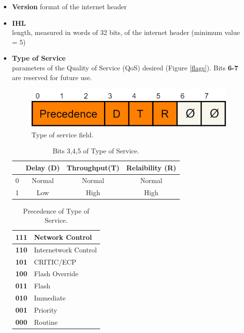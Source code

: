 \begin{itemize}
\item{\textbf{Version}
format of the internet header
}
\item{\textbf{IHL}\\
length, measured in words of 32 bits, of the internet header (minimum value = 5)
}
\item{\textbf{Type of Service}\\
parameters of the Quality of Service (QoS) desired (Figure \ref{flags}). Bits \textbf{6-7} are reserved for future use.
\begin{figure}[h]
\centering
\includegraphics[scale=0.3]{Images/IP/service_type}
\caption{\footnotesize{Type of service field.}}\label{service_type}
\end{figure}
\begin{table}[h]
\centering \footnotesize
\begin{tabular}{|c|c|c|c|}
\cline{2-4}
\multicolumn{1}{c|}{}&{Delay (D)}&{Throughput(T)}&{Relaibility (R)}\\
\hline
{0}&{Normal}&{Normal}&{Normal}\\
\hline
{1}&{Low}&{High}&{High}\\
\hline
\end{tabular}
\caption{Bits 3,4,5 of Type of Service.}
\end{table}
\begin{table}[H]
\centering \footnotesize
\begin{tabular}{|c|l|}
\hline
\textbf{111}&{Network Control}\\
\hline
\textbf{110}&{Internetwork Control}\\
\hline
\textbf{101}&{CRITIC/ECP}\\
\hline
\textbf{100}&{Flash Override}\\
\hline
\textbf{011}&{Flash}\\
\hline
\textbf{010}&{Immediate}\\
\hline
\textbf{001}&{Priority}\\
\hline
\textbf{000}&{Routine}\\
\hline
\end{tabular}
\caption{Precedence of Type of Service.}
\end{table}
}
\end{itemize}
